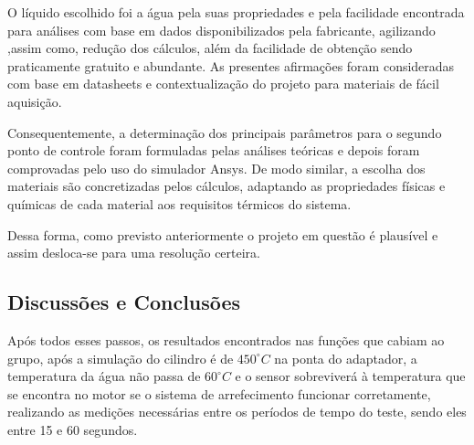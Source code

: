 O líquido escolhido foi a água pela suas propriedades e pela facilidade encontrada para análises com base em dados disponibilizados pela fabricante, agilizando ,assim como, redução dos cálculos, além da facilidade de obtenção sendo praticamente gratuito e abundante. As presentes afirmações foram consideradas com base em datasheets e contextualização do projeto para materiais de fácil aquisição.

Consequentemente, a determinação dos principais parâmetros para o segundo ponto de controle foram formuladas pelas análises teóricas e depois foram comprovadas pelo uso do simulador Ansys. De modo similar, a escolha dos materiais são concretizadas pelos cálculos, adaptando as propriedades físicas e químicas de cada material aos requisitos térmicos do sistema.

Dessa forma, como previsto anteriormente o projeto em questão é plausível e assim desloca-se para uma resolução certeira.

\subsection{Discussões e Conclusões}

Após todos esses passos, os resultados encontrados nas funções que cabiam ao grupo, após a simulação do cilindro é de $450^{\circ}C$ na ponta do adaptador, a temperatura da água não passa de $60^{\circ}C$ e o sensor sobreviverá à temperatura que se encontra no motor se o sistema de arrefecimento funcionar corretamente, realizando as medições necessárias entre os períodos de tempo do teste, sendo eles entre 15 e 60 segundos.
